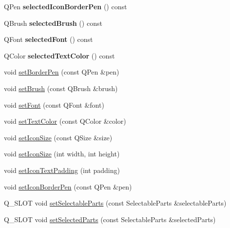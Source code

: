 \begin{DoxyCompactItemize}
\item 
\hypertarget{class_q_c_p_legend_ad8eb320ca3a25928982a65163e8f883b}{}\label{class_q_c_p_legend_ad8eb320ca3a25928982a65163e8f883b} 
Q\+Pen {\bfseries selected\+Icon\+Border\+Pen} () const
\item 
\hypertarget{class_q_c_p_legend_a77dfa9340f68ca195f1817a93db09757}{}\label{class_q_c_p_legend_a77dfa9340f68ca195f1817a93db09757} 
Q\+Brush {\bfseries selected\+Brush} () const
\item 
\hypertarget{class_q_c_p_legend_a483ffd35d64710a165da87b9d9f11110}{}\label{class_q_c_p_legend_a483ffd35d64710a165da87b9d9f11110} 
Q\+Font {\bfseries selected\+Font} () const
\item 
\hypertarget{class_q_c_p_legend_ab9b469b27787bfb2ce6c8978a31821af}{}\label{class_q_c_p_legend_ab9b469b27787bfb2ce6c8978a31821af} 
Q\+Color {\bfseries selected\+Text\+Color} () const
\item 
void \hyperlink{class_q_c_p_legend_a866a9e3f5267de7430a6c7f26a61db9f}{set\+Border\+Pen} (const Q\+Pen \&pen)
\item 
void \hyperlink{class_q_c_p_legend_a497bbcd38baa3598c08e2b3f48103f23}{set\+Brush} (const Q\+Brush \&brush)
\item 
void \hyperlink{class_q_c_p_legend_aa4cda8499e3cb0f3be415edc02984c73}{set\+Font} (const Q\+Font \&font)
\item 
void \hyperlink{class_q_c_p_legend_ae1eb239ff4a4632fe1b6c3e668d845c6}{set\+Text\+Color} (const Q\+Color \&color)
\item 
void \hyperlink{class_q_c_p_legend_a8b0740cce488bf7010da6beda6898984}{set\+Icon\+Size} (const Q\+Size \&size)
\item 
void \hyperlink{class_q_c_p_legend_a96b1a37fd4ee6a9778e6e54fe56ab6c2}{set\+Icon\+Size} (int width, int height)
\item 
void \hyperlink{class_q_c_p_legend_a62973bd69d5155e8ea3141366e8968f6}{set\+Icon\+Text\+Padding} (int padding)
\item 
void \hyperlink{class_q_c_p_legend_a2f2c93d18a651f4ff294bb3f026f49b8}{set\+Icon\+Border\+Pen} (const Q\+Pen \&pen)
\item 
Q\+\_\+\+S\+L\+OT void \hyperlink{class_q_c_p_legend_a9ce60aa8bbd89f62ae4fa83ac6c60110}{set\+Selectable\+Parts} (const Selectable\+Parts \&selectable\+Parts)
\item 
Q\+\_\+\+S\+L\+OT void \hyperlink{class_q_c_p_legend_a2aee309bb5c2a794b1987f3fc97f8ad8}{set\+Selected\+Parts} (const Selectable\+Parts \&selected\+Parts)
\item 

\end{DoxyCompactItemize}
